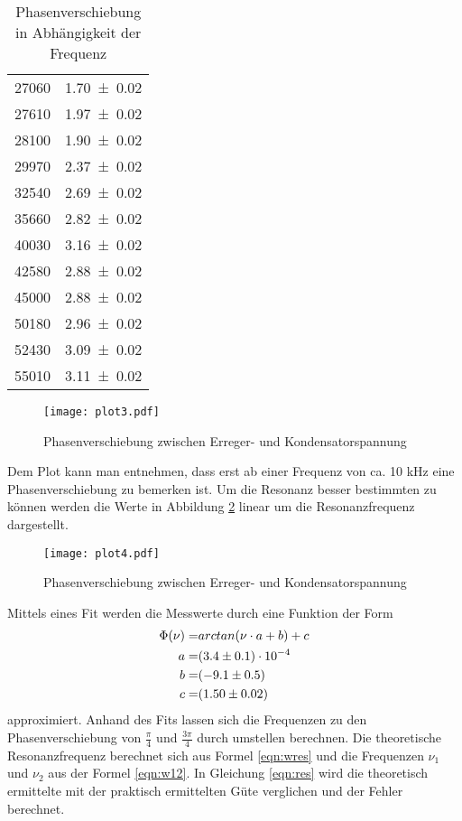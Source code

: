 \begin{table}
\begin{tabular}{c c}
	27060 	& \num{1.70 +- 0.02} \\
	27610 	& \num{1.97 +- 0.02} \\
	28100 	& \num{1.90 +- 0.02} \\
	29970 	& \num{2.37 +- 0.02} \\
	32540 	& \num{2.69 +- 0.02} \\
	35660 	& \num{2.82 +- 0.02} \\
	40030 	& \num{3.16 +- 0.02} \\
	42580 	& \num{2.88 +- 0.02} \\
	45000 	& \num{2.88 +- 0.02} \\
	50180 	& \num{2.96 +- 0.02} \\
	52430 	& \num{3.09 +- 0.02} \\
	55010 	& \num{3.11 +- 0.02} \\
  \end{tabular}
  \caption{Phasenverschiebung in Abhängigkeit der Frequenz}
  \label{tab:phi}
\end{table}
\begin{figure}
  \centering
  \texttt{[image: plot3.pdf]}
  \caption{Phasenverschiebung zwischen Erreger- und Kondensatorspannung}
  \label{fig:logphi}
\end{figure}
Dem Plot kann man entnehmen, dass erst ab einer Frequenz von ca. 10 kHz eine Phasenverschiebung zu bemerken ist. Um die Resonanz besser bestimmten zu können werden die Werte in Abbildung \ref{fig:Phi} linear um die Resonanzfrequenz dargestellt.
\begin{figure}
  \centering
  \texttt{[image: plot4.pdf]}
  \caption{Phasenverschiebung zwischen Erreger- und Kondensatorspannung}
  \label{fig:Phi}
\end{figure}
Mittels eines Fit werden die Messwerte durch eine Funktion der Form
\begin{eqnarray}
  \Phi (\nu)  =& arc tan(\nu \cdot a + b) + c \\
  \label{pfit}
  a =& (\num{3.4 +- 0.1}) \cdot 10^{-4}\\
  b =& (\num{-9.1 +- 0.5})\\
  c =& (\num{1.50 +- 0.02})\\
\end{eqnarray}
approximiert. Anhand des Fits lassen sich die Frequenzen zu den Phasenverschiebung von $\frac{\pi}{4}$ und $\frac{3 \pi}{4}$ durch umstellen berechnen. Die theoretische Resonanzfrequenz berechnet sich aus Formel \ref{eqn:wres} und die Frequenzen $\nu_1$ und $\nu_2$ aus der Formel \ref{eqn:w12}. In Gleichung \ref{eqn:res} wird die theoretisch ermittelte mit der praktisch ermittelten Güte verglichen und der Fehler berechnet.
